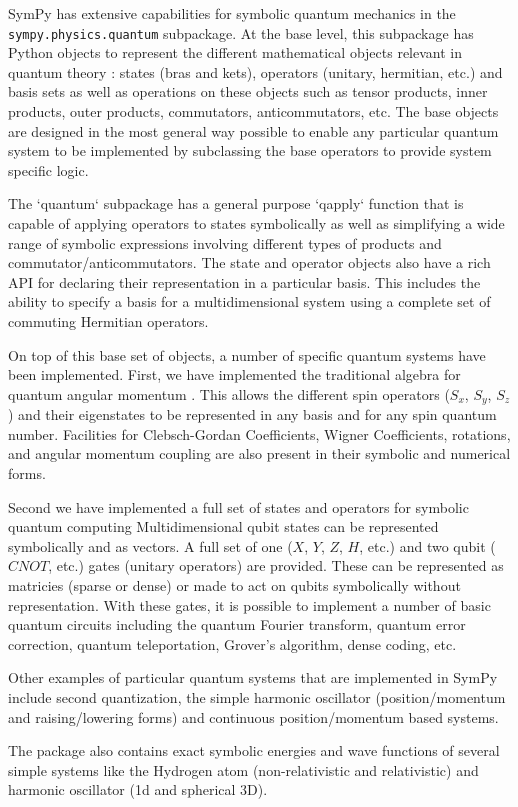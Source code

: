 SymPy has extensive capabilities for symbolic quantum mechanics in the
\verb|sympy.physics.quantum| subpackage. At the base level, this subpackage has
Python objects to represent the different mathematical objects relevant in
quantum theory \cite{sakurai}: states (bras and kets), operators (unitary,
hermitian, etc.) and basis sets as well as operations on these objects such as
tensor products, inner products, outer products, commutators, anticommutators,
etc.  The base objects are designed in the most general way possible to enable
any particular quantum system to be implemented by subclassing the base
operators to provide system specific logic.

The `quantum` subpackage has a general purpose `qapply` function that is
capable of applying operators to states symbolically as well as simplifying a
wide range of symbolic expressions involving different types of products and
commutator/anticommutators. The state and operator objects also have a rich API
for declaring their representation in a particular basis. This includes the
ability to specify a basis for a multidimensional system using a complete set
of commuting Hermitian operators.

On top of this base set of objects, a number of specific quantum systems have
been implemented. First, we have implemented the traditional algebra for
quantum angular momentum \cite{zare}. This allows the different spin operators
($S_x$, $S_y$, $S_z$) and their eigenstates to be represented in any basis and
for any spin quantum number. Facilities for Clebsch-Gordan Coefficients, Wigner
Coefficients, rotations, and angular momentum coupling are also present in
their symbolic and numerical forms.

Second we have implemented a full set of states and operators for symbolic
quantum computing \cite{nielsen} Multidimensional qubit states can be
represented symbolically and as vectors. A full set of one ($X$, $Y$, $Z$, $H$,
etc.) and two qubit ($CNOT$, etc.) gates (unitary operators) are provided.
These can be represented as matricies (sparse or dense) or made to act on
qubits symbolically without representation. With these gates, it is possible to
implement a number of basic quantum circuits including the quantum Fourier
transform, quantum error correction, quantum teleportation, Grover's algorithm,
dense coding, etc.

Other examples of particular quantum systems that are implemented in SymPy
include second quantization, the simple harmonic oscillator (position/momentum
and raising/lowering forms) and continuous position/momentum based systems.

The package also contains exact symbolic energies and wave functions of several
simple systems like the Hydrogen atom (non-relativistic and relativistic) and
harmonic oscillator (1d and spherical 3D).
